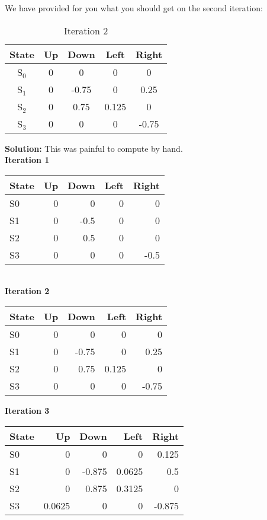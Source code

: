 \documentclass{exam}
\begin{document}
We have provided for you what you should get on the second iteration:  

\begin{table}[H] %
\centering
\begin{tabular}{c|c|c|c|c}
\textbf{State} & \textbf{Up} & \textbf{Down} & \textbf{Left} & \textbf{Right} \\
\hline
S$_0$ & 0      & 0     & 0     & 0 \\
S$_1$ & 0      & -0.75 & 0     & 0.25 \\
S$_2$ & 0      & 0.75  & 0.125 & 0 \\
S$_3$ & 0      & 0     & 0     & -0.75 \\
\end{tabular}
\caption{Iteration 2}
\end{table}


\textbf{Solution:} This was painful to compute by hand.\\

\textbf{Iteration 1}\\

\begin{tabular}{lrrrr}
\hline
State & Up & Down & Left & Right \\
\hline
S0 & 0 & 0 & 0 & 0 \\
S1 & 0 & -0.5 & 0 & 0 \\
S2 & 0 & 0.5 & 0 & 0 \\
S3 & 0 & 0 & 0 & -0.5 \\
\hline
\end{tabular}\\

\textbf{Iteration 2}\\

\begin{tabular}{lrrrr}
\hline
State & Up & Down & Left & Right \\
\hline
S0 & 0 & 0 & 0 & 0 \\
S1 & 0 & -0.75 & 0 & 0.25 \\
S2 & 0 & 0.75 & 0.125 & 0 \\
S3 & 0 & 0 & 0 & -0.75 \\
\hline
\end{tabular}

\textbf{Iteration 3}\\

\begin{tabular}{lrrrr}
\hline
State & Up & Down & Left & Right \\
\hline
S0 & 0 & 0 & 0 & 0.125 \\
S1 & 0 & -0.875 & 0.0625 & 0.5 \\
S2 & 0 & 0.875 & 0.3125 & 0 \\
S3 & 0.0625 & 0 & 0 & -0.875 \\
\hline
\end{tabular}\\
\end{document}
